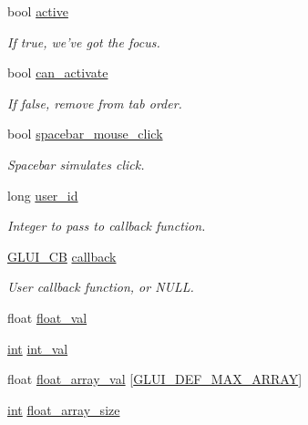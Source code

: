 \begin{DoxyCompactItemize}
bool \hyperlink{class_g_l_u_i___control_ad285387e771b46fb294935f68e967a77}{active}
\begin{DoxyCompactList}\small\item\em If true, we've got the focus. \end{DoxyCompactList}\item 
bool \hyperlink{class_g_l_u_i___control_a2484b0899bd5b56673a73387c9c530a7}{can\+\_\+activate}
\begin{DoxyCompactList}\small\item\em If false, remove from tab order. \end{DoxyCompactList}\item 
bool \hyperlink{class_g_l_u_i___control_a023da130fb762f944077c55d90aec839}{spacebar\+\_\+mouse\+\_\+click}
\begin{DoxyCompactList}\small\item\em Spacebar simulates click. \end{DoxyCompactList}\item 
long \hyperlink{class_g_l_u_i___control_a6c88b7c72b0800f88a5d4cda4868c8b6}{user\+\_\+id}
\begin{DoxyCompactList}\small\item\em Integer to pass to callback function. \end{DoxyCompactList}\item 
\hyperlink{class_g_l_u_i___c_b}{G\+L\+U\+I\+\_\+\+C\+B} \hyperlink{class_g_l_u_i___control_a96060fe0cc6d537e736dd6eef78e24ab}{callback}
\begin{DoxyCompactList}\small\item\em User callback function, or N\+U\+L\+L. \end{DoxyCompactList}\item 
float \hyperlink{class_g_l_u_i___control_ac69b8e62a6f4f16c83b70a64f73d7a1c}{float\+\_\+val}
\item 
\hyperlink{wglext_8h_a500a82aecba06f4550f6849b8099ca21}{int} \hyperlink{class_g_l_u_i___control_a4a890b5b5a854b34200b5e63f1069b4e}{int\+\_\+val}
\item 
float \hyperlink{class_g_l_u_i___control_a6d2cc0faaa678706939ac775c523871a}{float\+\_\+array\+\_\+val} \mbox{[}\hyperlink{glui_8h_ae6cbace033fae45e6088bf23b1f72f4a}{G\+L\+U\+I\+\_\+\+D\+E\+F\+\_\+\+M\+A\+X\+\_\+\+A\+R\+R\+A\+Y}\mbox{]}
\item 
\hyperlink{wglext_8h_a500a82aecba06f4550f6849b8099ca21}{int} \hyperlink{class_g_l_u_i___control_a504f6aff85729e665fa8664d170d9878}{float\+\_\+array\+\_\+size}
\item 

\end{DoxyCompactItemize}
